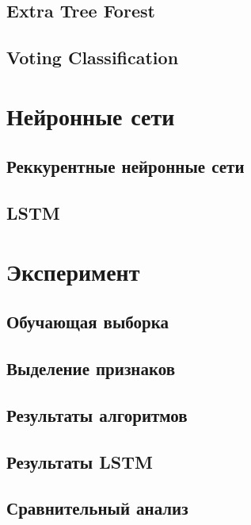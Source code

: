 \subsection{Extra Tree Forest}
\subsection{Voting Classification}
\clearpage

\section{Нейронные сети}
\subsection{Реккурентные нейронные сети}
\subsection{LSTM}
\clearpage

\section{Эксперимент}
\subsection{Обучающая выборка}
\subsection{Выделение признаков}
\subsection{Результаты алгоритмов}
\subsection{Результаты LSTM}
\subsection{Сравнительный анализ}


\clearpage